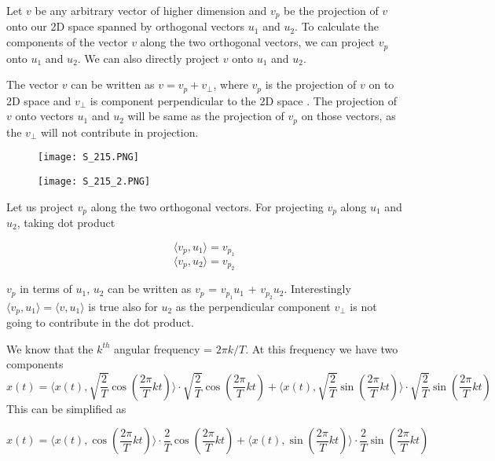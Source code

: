 \noindent
 Let $v$ be any arbitrary vector of higher dimension and $v_p$ be the projection of $v$ onto our 2D space spanned by orthogonal vectors $u_1$ and $u_2$. To calculate the components of the vector $v$ along the two orthogonal vectors, we can project $v_p$  onto $u_1$ and $u_2$. We can also directly project $v$ onto $u_1$ and $u_2$.
 


\noindent
 The vector $v$ can be written as $v = v_p  + v_\perp$, where $v_p$ is the projection of $v$ on to 2D space and $v_\perp$ is component perpendicular to the 2D space . The projection of $v$ onto vectors $u_1$ and $u_2$ will be same as the projection of $v_p$  on those vectors, as the $v_\perp$ will not contribute in projection.
 
\begin{figure}[ht]
\centering
\texttt{[image: S\_215.PNG]}		
\end{figure}

 \begin{figure}[ht]
\centering
\texttt{[image: S\_215\_2.PNG]}		
\end{figure}

\noindent
Let us project $v_p$ along the two orthogonal vectors. 
  For projecting  $v_p$  along $u_1$ and $u_2$, taking dot product 
 
\begin{equation*} \langle v_p, u_1 \rangle =v_{p_1} \end{equation*}
\begin{equation*} \langle v_p, u_2 \rangle = v_{p_2} \end{equation*}
 
\noindent
$v_p$  in terms of $u_1$, $u_2$ can be written as $v_p$  = $v_{p_1}u_1$ + $v_{p_2}u_2$. Interestingly  $\langle v_p, u_1 \rangle = \langle v, u_1 \rangle$ is true also for $u_2$ as the perpendicular component $v_\perp$ is not going to contribute in the dot product. 
        
We know that the $k^{th}$ angular frequency =  $2 \pi k/T$.
At this frequency we have two components 
\begin{equation*}x(t) = \langle x(t), \sqrt{\frac{2}{T}}\cos (\frac{2\pi}{T}kt)\rangle \cdot \sqrt{\frac{2}{T}}\cos (\frac{2\pi}{T}kt) + \langle x(t), \sqrt{\frac{2}{T}}\sin (\frac{2\pi}{T}kt)\rangle \cdot \sqrt{\frac{2}{T}}\sin (\frac{2\pi}{T}kt)\end{equation*}
This can be simplified as

\begin{equation*}x(t) = \langle x(t), \cos (\frac{2\pi}{T}kt)\rangle \cdot \frac{2}{T}\cos (\frac{2\pi}{T}kt) + \langle x(t), \sin (\frac{2\pi}{T}kt)\rangle \cdot \frac{2}{T}\sin (\frac{2\pi}{T}kt)\end{equation*}

